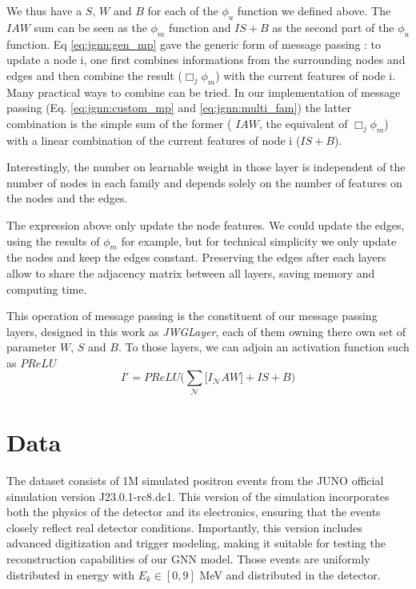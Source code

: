 \documentclass[../main.tex]{subfiles}
\begin{document}
We thus have a $S$, $W$ and $B$ for each of the $\phi_u$ function we defined above. The $IAW$ sum can be seen as the $\phi_m$ function and $IS+B$ as the second part of the $\phi_u$ function.
Eq \ref{eq:jgnn:gen_mp} gave the generic form of message passing : to update a node i, one first combines  informations from the surrounding nodes and edges and then combine the result ($\Box_j \phi_m$) with the current features of node i.
Many practical ways to combine can be tried. In our implementation of message passing (Eq. \ref{eq:jgnn:custom_mp} and \ref{eq:jgnn:multi_fam}) the latter combination is the simple sum of the former ( $IAW$, the equivalent of $\Box_j \phi_m$) with a linear combination of the current features of node i ($IS+B$).

Interestingly, the number on learnable weight in those layer is independent of the number of nodes in each family and depends solely on the number of features on the nodes and the edges.

The expression above only update the node features. We could update the edges, using the results of $\phi_m$ for example, but for technical simplicity we only update the nodes and keep the edges constant. Preserving the edges after each layers allow to share the adjacency matrix between all layers, saving memory and computing time.

This operation of message passing is the constituent of our message passing layers, designed in this work as \textit{JWGLayer}, each of them owning there own set of parameter $W$, $S$ and $B$. To those layers, we can adjoin an activation function such as $PReLU$
\begin{equation}
  I' = PReLU\bigg(\sum_\mathcal{N} \bigg[ I_{\mathcal{N}}AW \bigg] + IS + B \bigg)
\end{equation}


\section{Data}


The dataset consists of 1M simulated positron events from the JUNO official simulation version J23.0.1-rc8.dc1. This version of the simulation incorporates both the physics of the detector and its electronics, ensuring that the events closely reflect real detector conditions. Importantly, this version includes advanced digitization and trigger modeling, making it suitable for testing the reconstruction capabilities of our GNN model. Those events are uniformly distributed in energy with $E_k \in [0, 9]$ MeV and distributed in the detector.
\end{document}
